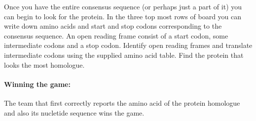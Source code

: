 Once you have the entire  consensus sequence (or perhaps just a part of it) you can begin to look for the protein. In the three top most rows
of board you can write down amino acids and start and stop codons corresponding to the consensus sequence. An open reading frame consist of 
a start codon, some intermediate codons and a stop codon. Identify open reading frames and translate intermediate codons using the supplied 
amino acid table. Find the protein that looks the most homologue. 

\paragraph{Winning the game:}
The team that first correctly reports the amino acid of the protein homologue and also its nucletide sequence wins the game.



